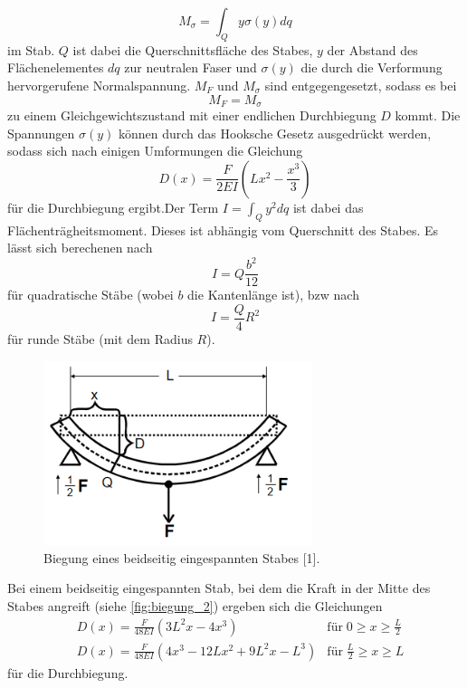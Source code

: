 \begin{equation}
    M_{\sigma} = \int_Q y \sigma(y) dq
\end{equation}
im Stab. $Q$ ist dabei die Querschnittsfläche des Stabes, $y$ der Abstand des Flächenelementes $dq$ zur neutralen Faser und $\sigma(y)$ die durch die Verformung hervorgerufene
Normalspannung.
$M_F$ und $M_\sigma$ sind entgegengesetzt, sodass es bei
\begin{equation}
    M_F = M_{\sigma}
\end{equation} 
zu einem Gleichgewichtszustand mit einer endlichen Durchbiegung $D$ kommt.
Die Spannungen $\sigma(y)$ können durch das Hooksche Gesetz ausgedrückt werden, sodass sich nach einigen Umformungen die Gleichung
\begin{equation}
    D(x) = \frac{F}{2EI} \left( L x^2 - \frac{x^3}{3}\right)
    \label{eq:einsietige_Biegung}
\end{equation} 
für die Durchbiegung ergibt.Der Term $I = \int_Q y^2 dq$ ist dabei das Flächenträgheitsmoment.
Dieses ist abhängig vom Querschnitt des Stabes. Es lässt sich berechenen nach
\begin{equation}
    I = Q \frac{b^2}{12}
    \label{eq:traegheitsmoment_quadratisch}
\end{equation}
für quadratische Stäbe (wobei $b$ die Kantenlänge ist), bzw nach
\begin{equation}
    I = \frac{Q}{4} R^2
    \label{eq:traegheitsmoment_rund}
\end{equation}
für runde Stäbe (mit dem Radius $R$).
\begin{figure}[H]
    \centering
    \includegraphics[width=0.7\textwidth]{assets/biegung_2.png}
    \caption{Biegung eines beidseitig eingespannten Stabes [1].}
    \label{fig:biegung_2}
\end{figure}
\noindent Bei einem beidseitig eingespannten Stab, bei dem die Kraft in der Mitte des Stabes angreift (siehe \autoref{fig:biegung_2}) ergeben sich die Gleichungen
\begin{align}
    & D(x) = \frac{F}{48EI} \left(3 L^2 x -4 x^3\right) & \mathrm{für} \; 0 \geq x \geq \frac{L}{2} \\
    & D(x) = \frac{F}{48EI} \left(4x^3 - 12 L x^2 + 9L^2 x - L^3\right) & \mathrm{für} \; \frac{L}{2} \geq x \geq L
    \label{eq:beidseitige_biegung}
\end{align}
für die Durchbiegung.